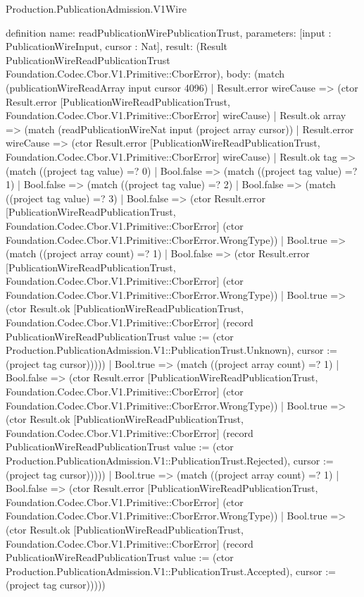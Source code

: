 \begin{lexlean}{Production.PublicationAdmission.V1Wire}
\begin{semanticmodule}
definition{
  name: readPublicationWirePublicationTrust,
  parameters: [input : PublicationWireInput, cursor : Nat],
  result: (Result PublicationWireReadPublicationTrust Foundation.Codec.Cbor.V1.Primitive::CborError),
  body: (match (publicationWireReadArray input cursor 4096)
    | Result.error wireCause => (ctor Result.error [PublicationWireReadPublicationTrust, Foundation.Codec.Cbor.V1.Primitive::CborError] wireCause)
    | Result.ok array => (match (readPublicationWireNat input (project array cursor))
      | Result.error wireCause => (ctor Result.error [PublicationWireReadPublicationTrust, Foundation.Codec.Cbor.V1.Primitive::CborError] wireCause)
      | Result.ok tag => (match ((project tag value) =? 0)
        | Bool.false => (match ((project tag value) =? 1)
          | Bool.false => (match ((project tag value) =? 2)
            | Bool.false => (match ((project tag value) =? 3)
              | Bool.false => (ctor Result.error [PublicationWireReadPublicationTrust, Foundation.Codec.Cbor.V1.Primitive::CborError] (ctor Foundation.Codec.Cbor.V1.Primitive::CborError.WrongType))
              | Bool.true => (match ((project array count) =? 1)
                | Bool.false => (ctor Result.error [PublicationWireReadPublicationTrust, Foundation.Codec.Cbor.V1.Primitive::CborError] (ctor Foundation.Codec.Cbor.V1.Primitive::CborError.WrongType))
                | Bool.true => (ctor Result.ok [PublicationWireReadPublicationTrust, Foundation.Codec.Cbor.V1.Primitive::CborError] (record PublicationWireReadPublicationTrust {value := (ctor Production.PublicationAdmission.V1::PublicationTrust.Unknown), cursor := (project tag cursor)}))))
            | Bool.true => (match ((project array count) =? 1)
              | Bool.false => (ctor Result.error [PublicationWireReadPublicationTrust, Foundation.Codec.Cbor.V1.Primitive::CborError] (ctor Foundation.Codec.Cbor.V1.Primitive::CborError.WrongType))
              | Bool.true => (ctor Result.ok [PublicationWireReadPublicationTrust, Foundation.Codec.Cbor.V1.Primitive::CborError] (record PublicationWireReadPublicationTrust {value := (ctor Production.PublicationAdmission.V1::PublicationTrust.Rejected), cursor := (project tag cursor)}))))
          | Bool.true => (match ((project array count) =? 1)
            | Bool.false => (ctor Result.error [PublicationWireReadPublicationTrust, Foundation.Codec.Cbor.V1.Primitive::CborError] (ctor Foundation.Codec.Cbor.V1.Primitive::CborError.WrongType))
            | Bool.true => (ctor Result.ok [PublicationWireReadPublicationTrust, Foundation.Codec.Cbor.V1.Primitive::CborError] (record PublicationWireReadPublicationTrust {value := (ctor Production.PublicationAdmission.V1::PublicationTrust.Accepted), cursor := (project tag cursor)}))))
}
\end{semanticmodule}
\end{lexlean}
